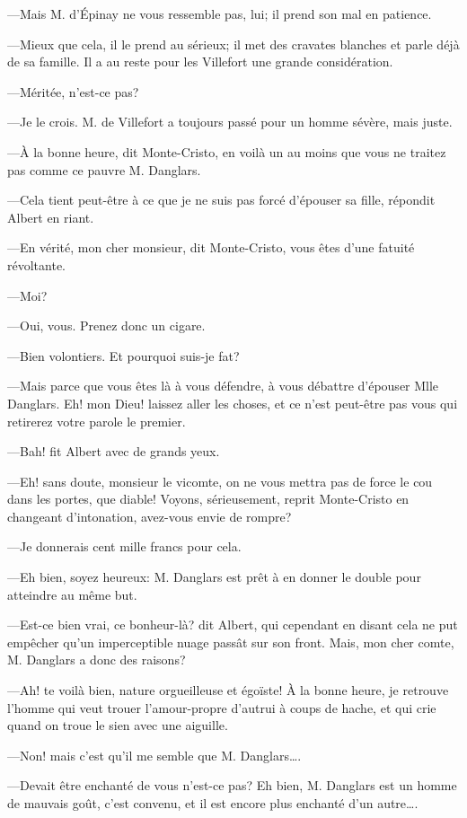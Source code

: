 —Mais M. d'Épinay ne vous ressemble pas, lui; il prend son mal en patience. 

—Mieux que cela, il le prend au sérieux; il met des cravates blanches et parle déjà de sa famille. Il a au reste pour les Villefort une grande considération. 

—Méritée, n'est-ce pas? 

—Je le crois. M. de Villefort a toujours passé pour un homme sévère, mais juste. 

—À la bonne heure, dit Monte-Cristo, en voilà un au moins que vous ne traitez pas comme ce pauvre M. Danglars. 

—Cela tient peut-être à ce que je ne suis pas forcé d'épouser sa fille, répondit Albert en riant. 

—En vérité, mon cher monsieur, dit Monte-Cristo, vous êtes d'une fatuité révoltante. 

—Moi? 

—Oui, vous. Prenez donc un cigare. 

—Bien volontiers. Et pourquoi suis-je fat? 

—Mais parce que vous êtes là à vous défendre, à vous débattre d'épouser Mlle Danglars. Eh! mon Dieu! laissez aller les choses, et ce n'est peut-être pas vous qui retirerez votre parole le premier. 

—Bah! fit Albert avec de grands yeux. 

—Eh! sans doute, monsieur le vicomte, on ne vous mettra pas de force le cou dans les portes, que diable! Voyons, sérieusement, reprit Monte-Cristo en changeant d'intonation, avez-vous envie de rompre? 

—Je donnerais cent mille francs pour cela. 

—Eh bien, soyez heureux: M. Danglars est prêt à en donner le double pour atteindre au même but. 

—Est-ce bien vrai, ce bonheur-là? dit Albert, qui cependant en disant cela ne put empêcher qu'un imperceptible nuage passât sur son front. Mais, mon cher comte, M. Danglars a donc des raisons? 

—Ah! te voilà bien, nature orgueilleuse et égoïste! À la bonne heure, je retrouve l'homme qui veut trouer l'amour-propre d'autrui à coups de hache, et qui crie quand on troue le sien avec une aiguille. 

—Non! mais c'est qu'il me semble que M. Danglars\dots. 

—Devait être enchanté de vous n'est-ce pas? Eh bien, M. Danglars est un homme de mauvais goût, c'est convenu, et il est encore plus enchanté d'un autre\dots. 


